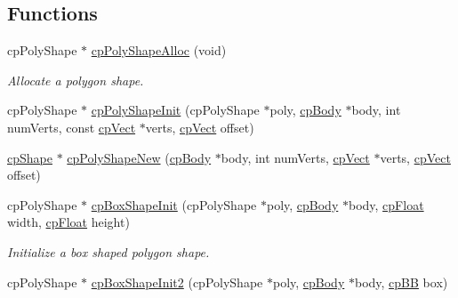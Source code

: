\subsection*{Functions}
\begin{DoxyCompactItemize}
\item 
\hypertarget{group__cp_poly_shape_ga3c45ef999add9db8c9d7115ace013b3e}{cp\-Poly\-Shape $\ast$ \hyperlink{group__cp_poly_shape_ga3c45ef999add9db8c9d7115ace013b3e}{cp\-Poly\-Shape\-Alloc} (void)}\label{group__cp_poly_shape_ga3c45ef999add9db8c9d7115ace013b3e}

\begin{DoxyCompactList}\small\item\em Allocate a polygon shape. \end{DoxyCompactList}\item 
cp\-Poly\-Shape $\ast$ \hyperlink{group__cp_poly_shape_ga9ee28361eca8a2ac440fe51476c6441d}{cp\-Poly\-Shape\-Init} (cp\-Poly\-Shape $\ast$poly, \hyperlink{structcp_body}{cp\-Body} $\ast$body, int num\-Verts, const \hyperlink{structcp_vect}{cp\-Vect} $\ast$verts, \hyperlink{structcp_vect}{cp\-Vect} offset)
\item 
\hyperlink{structcp_shape}{cp\-Shape} $\ast$ \hyperlink{group__cp_poly_shape_gab4a4748c2291066a87a81cf515fa336f}{cp\-Poly\-Shape\-New} (\hyperlink{structcp_body}{cp\-Body} $\ast$body, int num\-Verts, \hyperlink{structcp_vect}{cp\-Vect} $\ast$verts, \hyperlink{structcp_vect}{cp\-Vect} offset)
\item 
\hypertarget{group__cp_poly_shape_ga476f01323ea40342b8f08a32a158bf73}{cp\-Poly\-Shape $\ast$ \hyperlink{group__cp_poly_shape_ga476f01323ea40342b8f08a32a158bf73}{cp\-Box\-Shape\-Init} (cp\-Poly\-Shape $\ast$poly, \hyperlink{structcp_body}{cp\-Body} $\ast$body, \hyperlink{group__basic_types_gac1ed65573e035bf892505768c852d8d3}{cp\-Float} width, \hyperlink{group__basic_types_gac1ed65573e035bf892505768c852d8d3}{cp\-Float} height)}\label{group__cp_poly_shape_ga476f01323ea40342b8f08a32a158bf73}

\begin{DoxyCompactList}\small\item\em Initialize a box shaped polygon shape. \end{DoxyCompactList}\item 
\hypertarget{group__cp_poly_shape_ga22965f0e9808961967267065518339f0}{cp\-Poly\-Shape $\ast$ \hyperlink{group__cp_poly_shape_ga22965f0e9808961967267065518339f0}{cp\-Box\-Shape\-Init2} (cp\-Poly\-Shape $\ast$poly, \hyperlink{structcp_body}{cp\-Body} $\ast$body, \hyperlink{structcp_b_b}{cp\-B\-B} box)}\label{group__cp_poly_shape_ga22965f0e9808961967267065518339f0}


\end{DoxyCompactItemize}
